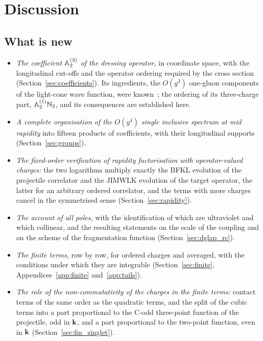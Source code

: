 \section{Discussion}\label{sec:discussion}


\subsection{What is new}\label{sec:disc_new}

\begin{itemize}
\item \emph{The coefficient $\mathbb{A}^{(3)}_2$ of the dressing operator,} in coordinate space, with the longitudinal cut-offs and the operator ordering required by the cross section (Section~\ref{sec:coefficients}). Its ingredients, the $O(g^3)$ one-gluon components of the light-cone wave function, were known~\cite{Lublinsky:2016meo}; the ordering of its three-charge part, $\mathbb{A}^{(1)}_2\mathbb{N}_2$, and its consequences are established here.
\item \emph{A complete organisation of the $O(g^4)$ single inclusive spectrum at mid rapidity} into fifteen products of coefficients, with their longitudinal supports (Section~\ref{sec:groups}).
\item \emph{The fixed-order verification of rapidity factorisation with operator-valued charges:} the two logarithms multiply exactly the BFKL evolution of the projectile correlator and the JIMWLK evolution of the target operator, the latter for an arbitrary ordered correlator, and the terms with more charges cancel in the symmetrised sense (Section~\ref{sec:rapidity}).
\item \emph{The account of all poles,} with the identification of which are ultraviolet and which collinear, and the resulting statements on the scale of the coupling and on the scheme of the fragmentation function (Section~\ref{sec:dglap_rc}).
\item \emph{The finite terms,} row by row, for ordered charges and averaged, with the conditions under which they are integrable (Section~\ref{sec:finite}, Appendices~\ref{app:finite} and~\ref{app:tails}).
\item \emph{The role of the non-commutativity of the charges in the finite terms:} contact terms of the same order as the quadratic terms, and the split of the cubic terms into a part proportional to the C-odd three-point function of the projectile, odd in $\mathbf{k}$, and a part proportional to the two-point function, even in $\mathbf{k}$ (Section~\ref{sec:fin_singlet}).
\end{itemize}

